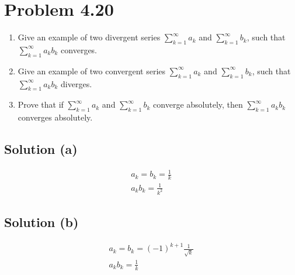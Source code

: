 \documentclass[12pt]{report}
\begin{document}
\section{Problem 4.20}
    \begin{enumerate}[label=(\alph*)]
        \item   Give an example of two divergent series $\sum_{k=1}^{\infty} a_k$ and $\sum_{k=1}^{\infty} b_k$, such that $\sum_{k=1}^{\infty} a_k b_k$ converges. 
        \item   Give an example of two convergent series $\sum_{k=1}^{\infty} a_k$ and $\sum_{k=1}^{\infty} b_k$, such that $\sum_{k=1}^{\infty} a_k b_k$ diverges. 
        \item   Prove that if $\sum_{k=1}^{\infty} a_k$ and $\sum_{k=1}^{\infty} b_k$ converge absolutely, then $\sum_{k=1}^{\infty} a_k b_k$ converges absolutely. 
    \end{enumerate}

    \subsection{Solution (a)}
        \begin{gather}
            a_k = b_k = \frac{1}{k}\\
            a_k b_k = \frac{1}{k^2}
        \end{gather}

    \subsection{Solution (b)}
        \begin{gather}
            a_k = b_k = (-1)^{k + 1} \frac{1}{\sqrt{k}}\\
            a_k b_k = \frac{1}{k}
        \end{gather}
\end{document}
